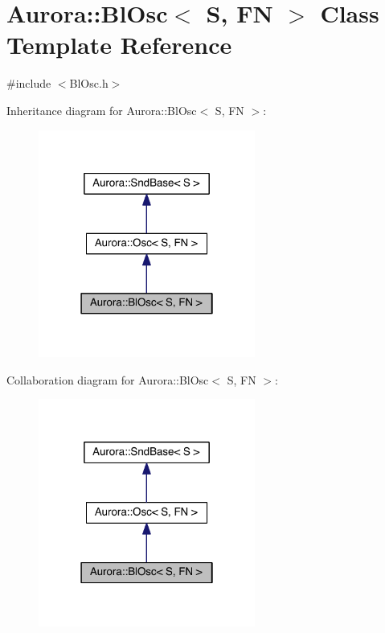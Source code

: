 \hypertarget{class_aurora_1_1_bl_osc}{}\section{Aurora\+:\+:Bl\+Osc$<$ S, FN $>$ Class Template Reference}
\label{class_aurora_1_1_bl_osc}


{\ttfamily \#include $<$Bl\+Osc.\+h$>$}



Inheritance diagram for Aurora\+:\+:Bl\+Osc$<$ S, FN $>$\+:
\nopagebreak
\begin{figure}[H]
\begin{center}
\leavevmode
\includegraphics[width=202pt]{class_aurora_1_1_bl_osc__inherit__graph}
\end{center}
\end{figure}


Collaboration diagram for Aurora\+:\+:Bl\+Osc$<$ S, FN $>$\+:
\nopagebreak
\begin{figure}[H]
\begin{center}
\leavevmode
\includegraphics[width=202pt]{class_aurora_1_1_bl_osc__coll__graph}
\end{center}
\end{figure}
